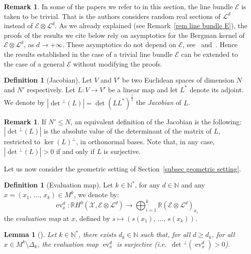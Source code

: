\documentclass[10pt]{amsart}
\newtheorem{lemm}[theo]{Lemma}\newtheorem{prop}[theo]{Proposition}\newtheorem{coro}[theo]{Corollary}\newtheorem{conj}[theo]{Conjecture}
\theoremstyle{definition}\newtheorem{defi}[theo]{Definition}\newtheorem{rema}[theo]{Remark}\newtheorem{exam}[theo]{Example}\newtheorem{exem}[theo]{Example}\newtheorem{nota}[theo]{Notation}
\DeclareMathOperator{\ev}{ev}
\newcommand{\E}{\mathcal{E}}
\newcommand{\X}{\mathcal{X}}
\renewcommand{\L}{\mathcal{L}}
\newcommand{\N}{\mathbb{N}}
\newcommand{\R}{\mathbb{R}}
\newcommand{\odet}[1]{\norm{\det\! ^\perp\!\left(#1\right)}}
\newcommand{\norm}[1]{\left\lvert #1 \right\rvert}
\renewcommand{\geq}{\geqslant}
\renewcommand{\leq}{\leqslant}
\begin{document}
\begin{rema}
In some of the papers we refer to in this section, the line bundle $\E$ is taken to be trivial. That is the authors considers random real sections of $\L^d$ instead of $\E \otimes \L^d$. As we already explained (see Remark~\ref{rem line bundle E}), the proofs of the results we cite below rely on asymptotics for the Bergman kernel of $\E \otimes \L^d$, as $d \to +\infty$. These asymptotics do not depend on $\E$, see~\cite[Theorem~4.2.1]{MM2007} and~\cite[Theorem~1]{MM2015}. Hence the results established in the case of a trivial line bundle $\E$ can be extended to the case of a general $\E$ without modifying the proofs.
\end{rema}

\begin{defi}[{Jacobian}]\label{def jacobian}
Let $V$ and $V'$ be two Euclidean spaces of dimension $N$ and $N'$ respectively. Let $L:V \to V'$ be a linear map and let $L^*$ denote its adjoint. We denote by $\odet{L} = \det(LL^*)^\frac{1}{2}$ the \emph{Jacobian} of $L$.
\end{defi}

\begin{rema}
If $N' \leq N$, an equivalent definition of the Jacobian is the following: $|\det\!^\perp\!(L)|$ is the absolute value of the determinant of the matrix of $L$, restricted to $\ker(L)^\perp$, in orthonormal bases. Note that, in any case, $|\det\!^\perp\!(L)| > 0$ if and only if $L$ is surjective.
\end{rema}

Let us now consider the geometric setting of Section~\ref{subsec geometric setting}.

\begin{defi}[{Evaluation map}]\label{def ev dx}
Let $k \in \N^*$, for any $d \in \N$ and any $x=(x_1,\,\dots,\,x_k)\in M^k$, we denote by:
\[
\ev^d_x:\R H^0\left(\X,\E \otimes \L^d\right) \longrightarrow \bigoplus_{i=1}^k \R\left(\E \otimes \L^d\right)_{x_i}
\]
the \emph{evaluation map} at $x$, defined by $s\mapsto (s(x_1),\,\dots,\,s(x_k))$.
\end{defi}

\begin{lemm}[{\cite[Proposition~2.11]{Anc2019}}]\label{lem surjectivity ev dx}
Let $k \in \N^*$, there exists $d_k \in \N$ such that, for all $d \geq d_k$, for all $x \in M^k \setminus \Delta_k$, the evaluation map $\ev^d_x$ is surjective (i.e.~$\det\!^\perp\!(\ev_x^d)>0$).
\end{lemm}
\end{document}
